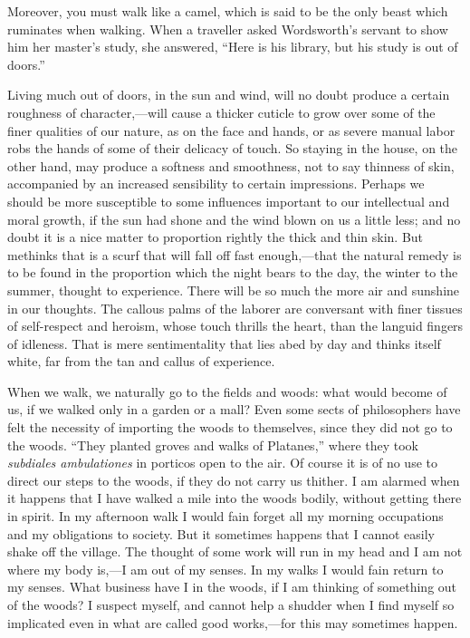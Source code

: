 \documentclass[twoside,openright,10pt]{memoir} %
\begin{document}
Moreover, you must walk like a camel, which is said to be the only beast which ruminates when walking. When a traveller asked Wordsworth’s servant to show him her master’s study, she answered, “Here is his library, but his study is out of doors.”

Living much out of doors, in the sun and wind, will no doubt produce a certain roughness of character,—will cause a thicker cuticle to grow over some of the finer qualities of our nature, as on the face and hands, or as severe manual labor robs the hands of some of their delicacy of touch. So staying in the house, on the other hand, may produce a softness and smoothness, not to say thinness of skin, accompanied by an increased sensibility to certain impressions. Perhaps we should be more susceptible to some influences important to our intellectual and moral growth, if the sun had shone and the wind blown on us a little less; and no doubt it is a nice matter to proportion rightly the thick and thin skin. But methinks that is a scurf that will fall off fast enough,—that the natural remedy is to be found in the proportion which the night bears to the day, the winter to the summer, thought to experience. There will be so much the more air and sunshine in our thoughts. The callous palms of the laborer are conversant with finer tissues of self-respect and heroism, whose touch thrills the heart, than the languid fingers of idleness. That is mere sentimentality that lies abed by day and thinks itself white, far from the tan and callus of experience.

When we walk, we naturally go to the fields and woods: what would become of us, if we walked only in a garden or a mall? Even some sects of philosophers have felt the necessity of importing the woods to themselves, since they did not go to the woods. “They planted groves and walks of Platanes,” where they took \emph{subdiales ambulationes} in porticos open to the air. Of course it is of no use to direct our steps to the woods, if they do not carry us thither. I am alarmed when it happens that I have walked a mile into the woods bodily, without getting there in spirit. In my afternoon walk I would fain forget all my morning occupations and my obligations to society. But it sometimes happens that I cannot easily shake off the village. The thought of some work will run in my head and I am not where my body is,—I am out of my senses. In my walks I would fain return to my senses. What business have I in the woods, if I am thinking of something out of the woods? I suspect myself, and cannot help a shudder when I find myself so implicated even in what are called good works,—for this may sometimes happen.
\end{document}
